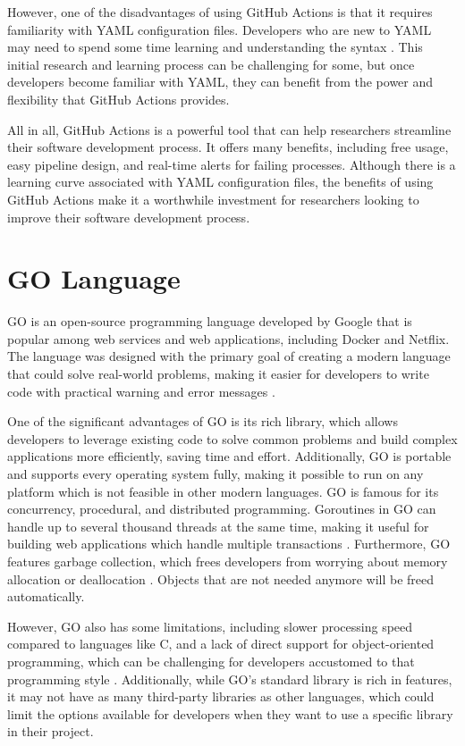 However, one of the disadvantages of using GitHub Actions is that it requires familiarity with YAML configuration files. Developers who are new to YAML may need to spend some time learning and understanding the syntax \cite{ds}. This initial research and learning process can be challenging for some, but once developers become familiar with YAML, they can benefit from the power and flexibility that GitHub Actions provides.

All in all, GitHub Actions is a powerful tool that can help researchers streamline their software development process. It offers many benefits, including free usage, easy pipeline design, and real-time alerts for failing processes. Although there is a learning curve associated with YAML configuration files, the benefits of using GitHub Actions make it a worthwhile investment for researchers looking to improve their software development process.

\section{GO Language}
GO is an open-source programming language developed by Google that is popular among web services and web applications, including Docker and Netflix. The language was designed with the primary goal of creating a modern language that could solve real-world problems, making it easier for developers to write code with practical warning and error messages \cite{mihalis}. 

One of the significant advantages of GO is its rich library, which allows developers to leverage existing code to solve common problems and build complex applications more efficiently, saving time and effort. Additionally, GO is portable and supports every operating system fully, making it possible to run on any platform which is not feasible in other modern languages\cite{andrew}. GO is famous for its concurrency, procedural, and distributed programming. Goroutines in GO can handle up to several thousand threads at the same time, making it useful for building web applications which handle multiple transactions  \cite{andrew, cgptt}. Furthermore, GO features garbage collection, which frees developers from worrying about memory allocation or deallocation \cite{andrew}. Objects that are not needed anymore will be freed automatically.

However, GO also has some limitations, including slower processing speed compared to languages like C, and a lack of direct support for object-oriented programming, which can be challenging for developers accustomed to that programming style \cite{mihalis}. Additionally, while GO's standard library is rich in features, it may not have as many third-party libraries as other languages, which could limit the options available for developers when they want to use a specific library in their project. 

